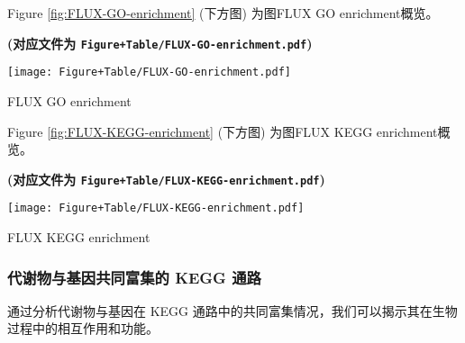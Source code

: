 \documentclass[
]{article}
\begin{document}
Figure \ref{fig:FLUX-GO-enrichment} (下方图) 为图FLUX GO enrichment概览。

\textbf{(对应文件为 \texttt{Figure+Table/FLUX-GO-enrichment.pdf})}

\def\@captype{figure}
\begin{center}
\texttt{[image: Figure+Table/FLUX-GO-enrichment.pdf]}
\caption{FLUX GO enrichment}\label{fig:FLUX-GO-enrichment}
\end{center}

\begin{center}\vspace{1.5cm}\end{center}

\begin{center}\vspace{1.5cm}\end{center}

Figure \ref{fig:FLUX-KEGG-enrichment} (下方图) 为图FLUX KEGG enrichment概览。

\textbf{(对应文件为 \texttt{Figure+Table/FLUX-KEGG-enrichment.pdf})}

\def\@captype{figure}
\begin{center}
\texttt{[image: Figure+Table/FLUX-KEGG-enrichment.pdf]}
\caption{FLUX KEGG enrichment}\label{fig:FLUX-KEGG-enrichment}
\end{center}

\begin{center}\vspace{1.5cm}\end{center}

\hypertarget{ux4ee3ux8c22ux7269ux4e0eux57faux56e0ux5171ux540cux5bccux96c6ux7684-kegg-ux901aux8def}{%
\subsubsection{代谢物与基因共同富集的 KEGG 通路}\label{ux4ee3ux8c22ux7269ux4e0eux57faux56e0ux5171ux540cux5bccux96c6ux7684-kegg-ux901aux8def}}

通过分析代谢物与基因在 KEGG 通路中的共同富集情况，我们可以揭示其在生物过程中的相互作用和功能。

\begin{center}\vspace{1.5cm}\end{center}
\end{document}
